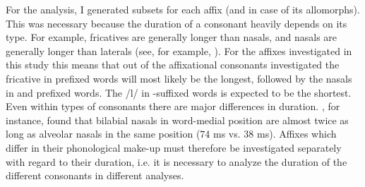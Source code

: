 For the analysis, I generated subsets for each affix (and in case of  its allomorphs). This was necessary because the duration of a consonant heavily depends on its type. For example, fricatives are generally longer than nasals, and nasals are generally longer than laterals (see, for example,  \citealt{Umeda.1977}). For the affixes investigated in this study this means that out of the affixational consonants investigated the fricative in prefixed words will most likely be the longest, followed by the nasals in  and prefixed words. The /l/ in -suffixed words is expected to be the shortest. Even within types of consonants there are major differences 
in duration. \cite{Umeda.1977}, for instance, found that bilabial nasals in word-medial position are almost twice as long as alveolar nasals in the same position (74 ms vs. 38 ms). 
Affixes which differ in their phonological make-up must therefore be investigated separately with regard to their duration, i.e. it is necessary to analyze the duration of the different consonants in different analyses. %




